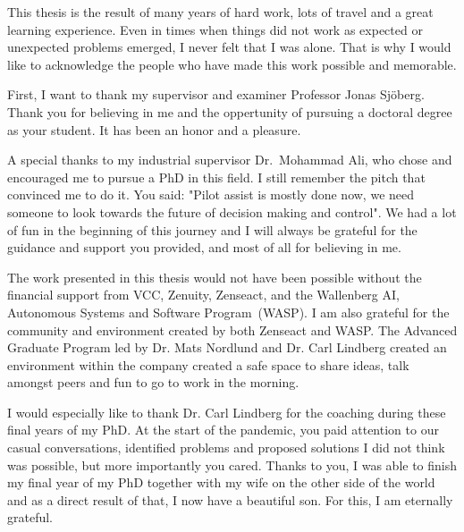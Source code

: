 



This thesis is the result of many years of hard work, lots of travel and a great learning experience. Even in times when things did not work as expected or unexpected problems emerged, I never felt that I was alone. That is why I would like to acknowledge the people who have made this work possible and memorable. 

First, I want to thank my supervisor and examiner Professor Jonas Sj\"oberg. 
Thank you for believing in me and the oppertunity of pursuing a doctoral degree as your student. It has been an honor and a pleasure.

A special thanks to my industrial supervisor Dr.~Mohammad Ali, who chose and encouraged me to pursue a PhD in this field. I still remember the pitch that convinced me to do it. You said: "Pilot assist is mostly done now, we need someone to look towards the future of decision making and control". We had a lot of fun in the beginning of this journey and I will always be grateful for the guidance and support you provided, and most of all for believing in me. 

The work presented in this thesis would not have been possible without the financial support from VCC, Zenuity, Zenseact, and the Wallenberg AI, Autonomous Systems and Software Program~(WASP). I am also grateful for the community and environment created by both Zenseact and WASP. The Advanced Graduate Program led by Dr. Mats Nordlund and Dr. Carl Lindberg created an environment within the company created a safe space to share ideas, talk amongst peers and fun to go to work in the morning. 

I would especially like to thank Dr. Carl Lindberg for the coaching during these final years of my PhD. At the start of the pandemic, you paid attention to our casual conversations, identified problems and proposed solutions I did not think was possible, but more importantly you cared. Thanks to you, I was able to finish my final year of my PhD together with my wife on the other side of the world and as a direct result of that, I now have a beautiful son. For this, I am eternally grateful. 
 
